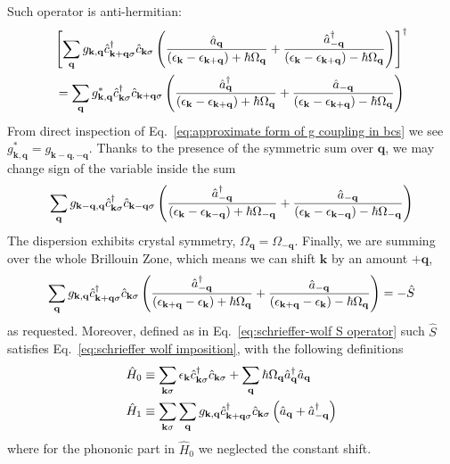 Such operator is anti-hermitian:
\begin{multline*}
	\left[{\sum_\mathbf{q} g_{\mathbf{k},\mathbf{q}} \hat{c}_{\mathbf{k}+\mathbf{q}\sigma}^\dagger \hat{c}_{\mathbf{k}\sigma} \left({
		\frac{\hat{a}_\mathbf{q}}{\left({\epsilon_\mathbf{k} - \epsilon_{\mathbf{k}+\mathbf{q}}}\right)+\hbar\Omega_\mathbf{q}} + \frac{\hat{a}_{-\mathbf{q}}^\dagger}{\left({\epsilon_\mathbf{k} - \epsilon_{\mathbf{k}+\mathbf{q}}}\right)-\hbar\Omega_\mathbf{q}}
	}\right)}\right]^\dagger \\
	= \sum_\mathbf{q} g_{\mathbf{k},\mathbf{q}}^* \hat{c}_{\mathbf{k}\sigma}^\dagger \hat{c}_{\mathbf{k}+\mathbf{q}\sigma} \left({
		\frac{\hat{a}_\mathbf{q}^\dagger}{\left({\epsilon_\mathbf{k} - \epsilon_{\mathbf{k}+\mathbf{q}}}\right)+\hbar\Omega_\mathbf{q}} + \frac{\hat{a}_{-\mathbf{q}}}{\left({\epsilon_\mathbf{k} - \epsilon_{\mathbf{k}+\mathbf{q}}}\right)-\hbar\Omega_\mathbf{q}}
	}\right) 
\end{multline*}
From direct inspection of Eq.~\eqref{eq:approximate form of g coupling in bcs} we see $g_{\mathbf{k},\mathbf{q}}^* = g_{\mathbf{k}-\mathbf{q},-\mathbf{q}}$. Thanks to the presence of the symmetric sum over $\mathbf{q}$, we may change sign of the variable inside the sum
\[
	\sum_\mathbf{q} g_{\mathbf{k}-\mathbf{q},\mathbf{q}} \hat{c}_{\mathbf{k}\sigma}^\dagger \hat{c}_{\mathbf{k}-\mathbf{q}\sigma} \left({
		\frac{\hat{a}_{-\mathbf{q}}^\dagger}{\left({\epsilon_\mathbf{k} - \epsilon_{\mathbf{k}-\mathbf{q}}}\right)+\hbar\Omega_{-\mathbf{q}}} + \frac{\hat{a}_{-\mathbf{q}}}{\left({\epsilon_\mathbf{k} - \epsilon_{\mathbf{k}-\mathbf{q}}}\right)-\hbar\Omega_{-\mathbf{q}}}
	}\right) 
\]
The dispersion exhibits crystal symmetry, $\Omega_\mathbf{q} = \Omega_{-\mathbf{q}}$. Finally, we are summing over the whole Brillouin Zone, which means we can shift $\mathbf{k}$ by an amount $+\mathbf{q}$,
\[
	\sum_\mathbf{q} g_{\mathbf{k},\mathbf{q}} \hat{c}_{\mathbf{k}+\mathbf{q}\sigma}^\dagger \hat{c}_{\mathbf{k}\sigma} \left({
		\frac{\hat{a}_{-\mathbf{q}}^\dagger}{\left({\epsilon_{\mathbf{k}+\mathbf{q}} - \epsilon_\mathbf{k}}\right)+\hbar\Omega_\mathbf{q}} + \frac{\hat{a}_{-\mathbf{q}}}{\left({\epsilon_{\mathbf{k}+\mathbf{q}} - \epsilon_{\mathbf{k}}}\right)-\hbar\Omega_\mathbf{q}}
	}\right) = - \hat S
\]
as requested. Moreover, defined as in Eq.~\eqref{eq:schrieffer-wolf S operator} such $\hat S$ satisfies Eq.~\eqref{eq:schrieffer wolf imposition}, with the following definitions
\[
\begin{aligned}
	\hat H_0 &\equiv \sum_{\mathbf{k}\sigma} \epsilon_{\mathbf{k}} \hat{c}_{\mathbf{k}\sigma}^\dagger \hat{c}_{\mathbf{k}\sigma} + \sum_\mathbf{q} \hbar\Omega_\mathbf{q} \hat a_\mathbf{q}^\dagger \hat a_\mathbf{q} \\
	\hat H_1 &\equiv \sum_{\mathbf{k}\sigma} \sum_\mathbf{q} g_{\mathbf{k},\mathbf{q}} \hat{c}_{\mathbf{k}+\mathbf{q}\sigma}^\dagger \hat{c}_{\mathbf{k}\sigma} \left({
		\hat{a}_\mathbf{q} + \hat{a}_{-\mathbf{q}}^\dagger
	}\right)
\end{aligned}
\]
where for the phononic part in $\hat H_0$ we neglected the constant shift.

